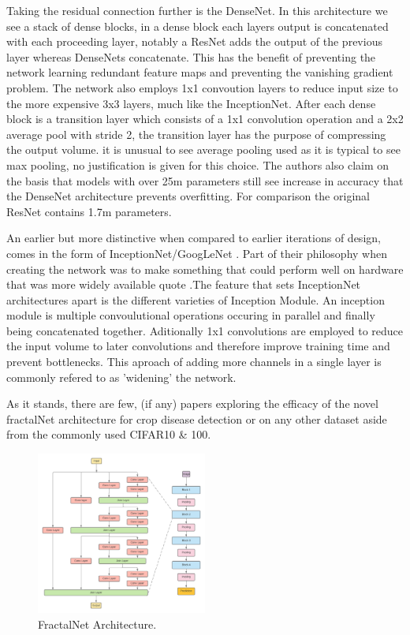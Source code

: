   Taking the residual connection further is the DenseNet. In this architecture we see a stack of dense blocks, in a dense block each layers output is concatenated with each proceeding layer, notably a ResNet adds the output of the previous layer whereas DenseNets concatenate. This has the benefit of preventing the network learning redundant feature maps and preventing the vanishing gradient problem. The network also employs 1x1 convoution layers to reduce input size to the more expensive 3x3 layers, much like the InceptionNet. After each dense block is a transition layer which consists of a 1x1 convolution operation and a 2x2 average pool with stride 2, the transition layer has the purpose of compressing the output volume. it is unusual to see average pooling used as it is typical to see max pooling, no justification is given for this choice. The authors also claim on the basis that models with over 25m parameters still see increase in accuracy that the DenseNet architecture prevents overfitting. For comparison the original ResNet contains 1.7m parameters.
  \par
  An earlier but more distinctive when compared to earlier iterations of design, comes in the form of InceptionNet/GoogLeNet \cite{Szegedy2015}. Part of their philosophy when creating the network was to make something that could perform well on hardware that was more widely available quote \cite{Szegedy2015}.The feature that sets InceptionNet architectures apart is the different varieties of Inception Module. An inception module is multiple convoulutional operations occuring in parallel and finally being concatenated together. Aditionally 1x1 convolutions are employed to reduce the input volume to later convolutions and therefore improve training time and prevent bottlenecks. This aproach of adding more channels in a single layer is commonly refered to as 'widening' the network.
  \par
  As it stands, there are few, (if any) papers exploring the efficacy of the novel fractalNet architecture \cite{Larsson2016} for crop disease detection or on any other dataset aside from the commonly used CIFAR10 \& 100.
  \par
    \begin{figure}
      \centering
      \includegraphics[width=0.5\textwidth]{Images/FractalNetArchitectureCopy}
      \caption{\label{fig:FractalNet_arcitecture}FractalNet Architecture.}
    \end{figure}
